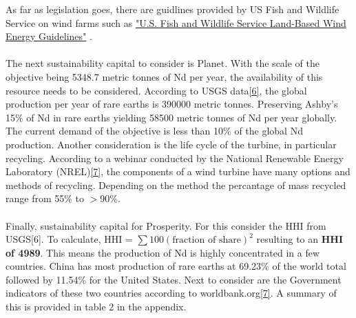 \documentclass[11pt]{article}
\begin{document}
As far as legislation goes, there are guidlines provided by US Fish and Wildlife Service on wind farms such as \href{https://www.fws.gov/sites/default/files/documents/land-based-wind-energy-guidelines.pdf}{"U.S. Fish and Wildlife Service
Land-Based Wind Energy Guidelines"} .
\\~\\
The next sustainability capital to consider is Planet. With the scale of the objective being 5348.7 metric tonnes of Nd per year, the availability of this resource needs to be considered.
According to USGS data\href{https://pubs.usgs.gov/periodicals/mcs2025/mcs2025.pdf}{[6]}, the global production per year of rare earths is 390000 metric tonnes. Preserving Ashby's 15\% of Nd in rare earths yielding 58500 metric tonnes of Nd per year globally.
The current demand of the objective is less than 10\% of the global Nd production. Another consideration is the life cycle of the turbine, in particular recycling. 
According to a webinar conducted by the National Renewable Energy Laboratory (NREL)\href{https://docs.nrel.gov/docs/fy24osti/89658.pdf}{[7]}, the components of a wind turbine have many options and methods of recycling. Depending on the method the percantage of mass recycled range from 55\% to $>$90\%.
\\~\\ 
Finally, sustainability capital for Prosperity. For this consider the HHI from USGS[6]. 
To calculate, HHI = $\sum 100(\text{fraction of share})^2$ resulting to an \textbf{HHI of 4989}. This means the production of Nd is highly concentrated in a few countries. China has most production of rare earths at 69.23\% of the world total followed by 11.54\% for the United States.  
Next to consider are the Government indicators of these two countries according to worldbank.org\href{https://www.worldbank.org/en/publication/worldwide-governance-indicators/interactive-data-access}{[7]}. A summary of this is provided in table 2 in the appendix.
\\~\\
\end{document}
